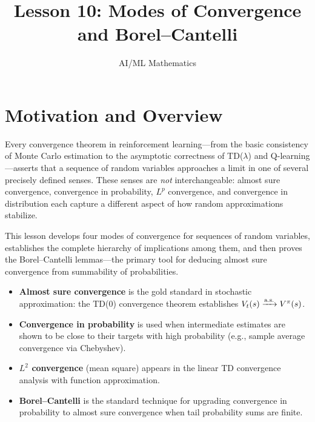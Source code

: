 \documentclass[11pt,a4paper]{article}
\title{Lesson 10: Modes of Convergence and Borel--Cantelli}
\author{AI/ML Mathematics}
\date{}
\begin{document}
\maketitle
\tableofcontents
\newpage


\section{Motivation and Overview}
\label{sec:motivation}

Every convergence theorem in reinforcement learning---from the basic
consistency of Monte Carlo estimation to the asymptotic correctness
of TD($\lambda$) and Q-learning---asserts that a sequence of random
variables approaches a limit in one of several precisely defined
senses.  These senses are \emph{not} interchangeable: almost sure
convergence, convergence in probability, $L^p$ convergence, and
convergence in distribution each capture a different aspect of how
random approximations stabilize.

This lesson develops four modes of convergence for sequences of
random variables, establishes the complete hierarchy of implications
among them, and then proves the Borel--Cantelli lemmas---the primary
tool for deducing almost sure convergence from summability of
probabilities.

\begin{rlconnection}[title={Why This Matters for RL}]
\begin{itemize}[nosep]
  \item \textbf{Almost sure convergence} is the gold standard in
    stochastic approximation: the TD(0) convergence theorem
    establishes $V_t(s) \xrightarrow{\text{a.s.}} V^\pi(s)$.
  \item \textbf{Convergence in probability} is used when
    intermediate estimates are shown to be close to their targets
    with high probability (e.g., sample average convergence via
    Chebyshev).
  \item \textbf{$L^2$ convergence} (mean square) appears in the
    linear TD convergence analysis with function approximation.
  \item \textbf{Borel--Cantelli} is the standard technique for
    upgrading convergence in probability to almost sure convergence
    when tail probability sums are finite.
\end{itemize}
\end{rlconnection}
\end{document}
